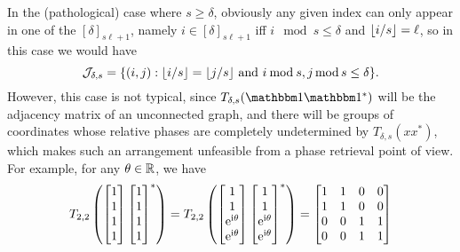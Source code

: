 In the (pathological) case where $s \ge \delta$, obviously any given index can only appear in one of the $[\delta]_{s \ell + 1}$, namely $i \in [\delta]_{s \ell + 1}$ iff $i \mod s \le \delta$ and $\lfloor i / s\rfloor = \ell$, so in this case we would have \[\mathcal{J}_{\delta, s} = \{(i, j) : \lfloor i / s\rfloor = \lfloor j / s\rfloor \ \text{and} \ i \mathbin{\mathrm{mod}} s, j \operatorname{\mathbin{mod}} s \le \delta\}.\]  However, this case is not typical, since $T_{\delta, s}(\one \one^*)$ will be the adjacency matrix of an unconnected graph, and there will be groups of coordinates whose relative phases are completely undetermined by $T_{\delta, s}(x x^*)$, which makes such an arrangement unfeasible from a phase retrieval point of view.  For example, for any $\theta \in \mathbb{R}$, we have \[T_{2, 2}\left(\begin{bmatrix} 1 \\ 1 \\ 1 \\ 1 \end{bmatrix} \begin{bmatrix} 1 \\ 1 \\ 1 \\ 1 \end{bmatrix}^*\right) = T_{2, 2}\left(\begin{bmatrix} 1 \\ 1 \\ \mathrm{e}^{\mathrm{i} \theta} \\ \mathrm{e}^{\mathrm{i} \theta} \end{bmatrix} \begin{bmatrix} 1 \\ 1 \\ \mathrm{e}^{\mathrm{i} \theta} \\ \mathrm{e}^{\mathrm{i} \theta} \end{bmatrix}^*\right) = \begin{bmatrix} 1 & 1 & 0 & 0 \\ 1 & 1 & 0 & 0 \\ 0 & 0 & 1 & 1 \\ 0 & 0 & 1 & 1 \end{bmatrix} \] %

